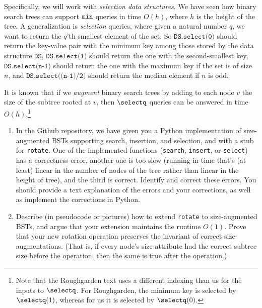 \documentclass[11pt]{article}
\begin{document}
\begin{enumerate}
    Specifically, we will work with {\em selection data structures}.
    We have seen how binary search trees can support $\texttt{min}$ queries in time $O(h)$, where $h$ is the height of the tree.  A generalization is {\em selection} queries, where given a natural number $q$, we want to return the $q$'th smallest element of the set.  So $\texttt{DS.select(0)}$ should return the key-value pair with the minimum key among those stored by the data structure $\texttt{DS}$, $\texttt{DS.select(1)}$ should return the one with the second-smallest key, $\texttt{DS.select(n-1)}$ should return the one with the maximum key if the set is of size $n$, and $\texttt{DS.select((n-1)/2)}$ should return the median element if $n$ is odd.
    
    It is known that if we {\em augment} binary search trees by adding to each node $v$ the size of the subtree rooted at $v$, then $\selectq$ queries can be answered in time $O(h)$.\footnote{Note that the Roughgarden text uses a different indexing than us for the inputs to $\selectq$. For Roughgarden, the minimum key is selected by $\selectq(1)$, whereas for us it is selected by $\selectq(0)$.}

    
    \begin{enumerate}
        \item In the Github repository, we have given you a Python implementation of size-augmented BSTs supporting search, insertion, and selection, and with a stub for \texttt{rotate}. One of the implemented functions (\texttt{search}, \texttt{insert}, or \texttt{select}) has a correctness error, another one is too slow (running in time that's (at least) linear in the number of nodes of the tree rather than linear in the height of tree), and the third is correct. 
        Identify and correct these errors. You should provide a text explanation of the errors and your corrections, as well as implement the corrections in Python.    

       
        
    
        
        \item Describe (in pseudocode or pictures) how to extend \texttt{rotate} to size-augmented BSTs, and argue that your extension maintains the runtime $O(1)$. Prove that your new rotation operation preserves the invariant of correct size-augmentations. (That is, if every node's size attribute had the correct subtree size before the operation, then the same is true after the operation.)

        
    

\end{enumerate}
\end{enumerate}
\end{document}
